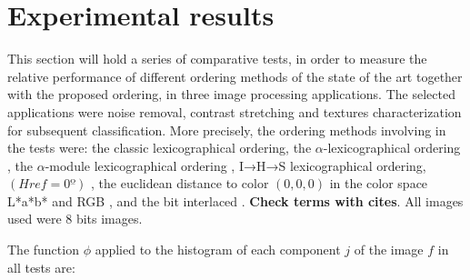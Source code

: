 \section{Experimental results}
This section will hold a series of comparative tests, in order to measure the relative performance of different ordering methods of the state of the art together with the proposed ordering, in three image processing applications. The selected applications were noise removal, contrast stretching and textures characterization for subsequent classification.
More precisely, the ordering methods involving in the tests were:
the classic lexicographical ordering, the $\alpha$-lexicographical ordering \cite{zamora2001comparative}, the $\alpha$-module lexicographical ordering \cite{angulo2003morphological}, I→H→S lexicographical ordering, $(Href=0º)$ \cite{ortiz2004gaussian}, the euclidean distance to color $(0,0,0)$ in the color space L*a*b* and RGB \cite{ortiz2002procesamiento}, and the bit interlaced \cite{chanussot1997bit}. \textbf{Check terms with cites}.
All images used were $8$ bits images. 

The function $\phi$ applied to the histogram of each component $j$ of the image $f$ in all tests are:

